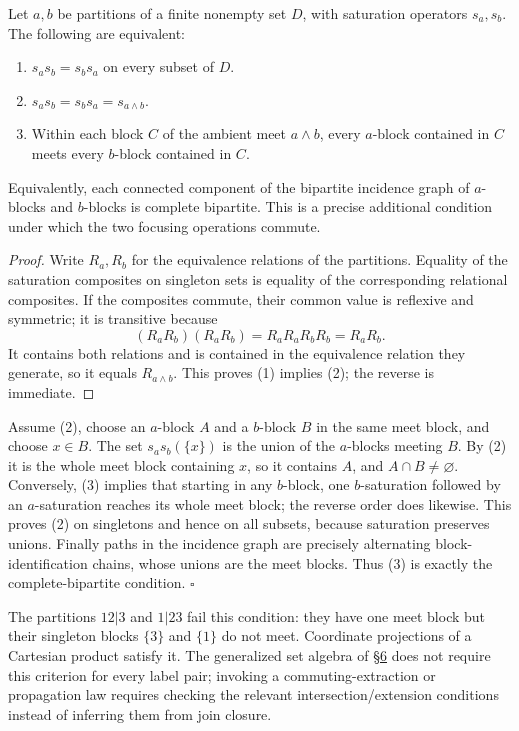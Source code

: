 
\begin{thmplain}

Let \(a,b\) be partitions of a finite nonempty set \(D\), with saturation operators \(s_a,s_b\). The following are equivalent:

\begin{enumerate}
\def\labelenumi{\arabic{enumi}.}
\tightlist
\item
  \(s_a s_b=s_b s_a\) on every subset of \(D\).
\item
  \(s_a s_b=s_b s_a=s_{a\wedge b}\).
\item
  Within each block \(C\) of the ambient meet \(a\wedge b\), every \(a\)-block contained in \(C\) meets every \(b\)-block contained in \(C\).
\end{enumerate}

Equivalently, each connected component of the bipartite incidence graph of \(a\)-blocks and \(b\)-blocks is complete bipartite. This is a precise additional condition under which the two focusing operations commute.
\end{thmplain}

\begin{proof}

Write \(R_a,R_b\) for the equivalence relations of the partitions. Equality of the saturation composites on singleton sets is equality of the corresponding relational composites. If the composites commute, their common value is reflexive and symmetric; it is transitive because
\[(R_aR_b)(R_aR_b)=R_aR_aR_bR_b=R_aR_b.\]
It contains both relations and is contained in the equivalence relation they generate, so it equals \(R_{a\wedge b}\). This proves (1) implies (2); the reverse is immediate.
\end{proof}

Assume (2), choose an \(a\)-block \(A\) and a \(b\)-block \(B\) in the same meet block, and choose \(x\in B\). The set \(s_a s_b(\{x\})\) is the union of the \(a\)-blocks meeting \(B\). By (2) it is the whole meet block containing \(x\), so it contains \(A\), and \(A\cap B\ne\varnothing\). Conversely, (3) implies that starting in any \(b\)-block, one \(b\)-saturation followed by an \(a\)-saturation reaches its whole meet block; the reverse order does likewise. This proves (2) on singletons and hence on all subsets, because saturation preserves unions. Finally paths in the incidence graph are precisely alternating block-identification chains, whose unions are the meet blocks. Thus (3) is exactly the complete-bipartite condition. \(\square\)

The partitions \(12|3\) and \(1|23\) fail this condition: they have one meet block but their singleton blocks \(\{3\}\) and \(\{1\}\) do not meet. Coordinate projections of a Cartesian product satisfy it. The generalized set algebra of \hyperlink{sec:6}{§6} does not require this criterion for every label pair; invoking a commuting-extraction or propagation law requires checking the relevant intersection/extension conditions instead of inferring them from join closure.
